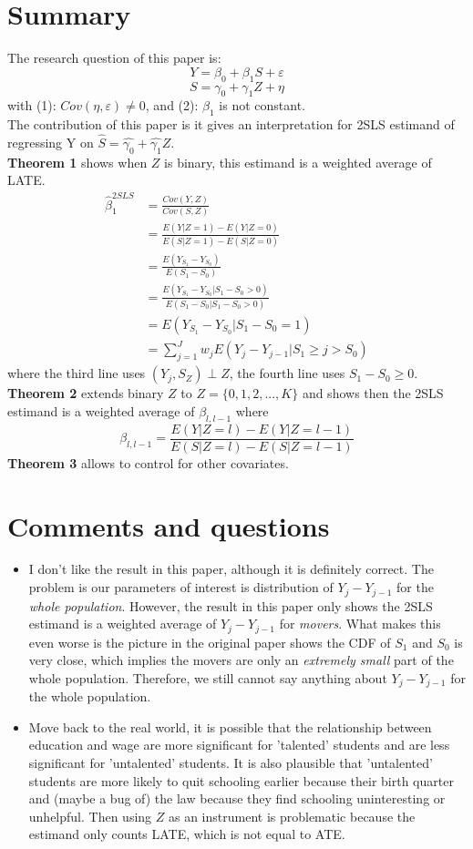 \documentclass[a4paper,11pt]{article}
\begin{document}
\section{Summary}
The research question of this paper is:
\[Y=\beta_0+\beta_1 S+\varepsilon\]
\[S=\gamma_0+\gamma_1 Z+\eta\]
with (1): $Cov(\eta,\varepsilon)\neq0$, and (2): $\beta_1$ is not constant. \\
The contribution of this paper is it gives an interpretation for 2SLS estimand of regressing Y on $\hat{S}=\hat{\gamma_0}+ \hat{\gamma_1} Z$. \\
\textbf{Theorem 1} shows when $Z$ is binary, this estimand is a weighted average of LATE.
\[\begin{aligned}
\hat{\beta}_1^{2SLS}&=\frac{Cov(Y,Z)}{Cov(S,Z)} \\
&=\frac{E(Y|Z=1)-E(Y|Z=0)}{E(S|Z=1)-E(S|Z=0)} \\
&=\frac{E(Y_{S_1}-Y_{S_0})}{E(S_1-S_0)} \\
&=\frac{E(Y_{S_1}-Y_{S_0}|S_1-S_0>0)}{E(S_1-S_0|S_1-S_0>0)} \\
&=E(Y_{S_1}-Y_{S_0}|S_1-S_0=1) \\
&=\sum_{j=1}^J w_j E(Y_j-Y_{j-1}|S_1 \geq j>S_0)
\end{aligned}\]
where the third line uses $(Y_j,S_Z) \perp Z$, the fourth line uses $S_1-S_0 \geq 0$. \\
\textbf{Theorem 2} extends binary $Z$ to $Z=\{0,1,2,...,K\}$ and shows then the 2SLS estimand is a weighted average of $\beta_{l,l-1}$ where
\[\beta_{l,l-1}=\frac{E(Y|Z=l)-E(Y|Z=l-1)}{E(S|Z=l)-E(S|Z=l-1)}\]
\textbf{Theorem 3} allows to control for other covariates.

\section{Comments and questions}
\begin{itemize}
\item
I don't like the result in this paper, although it is definitely correct. The problem is our parameters of interest is distribution of $Y_j-Y_{j-1}$ for the {\it whole population}. However, the result in this paper only shows the 2SLS estimand is a weighted average of $Y_j-Y_{j-1}$ for {\it movers}. What makes this even worse is the picture in the original paper shows the CDF of $S_1$ and $S_0$ is very close, which implies the movers are only an {\it extremely small} part of the whole population. Therefore, we still cannot say anything about $Y_j-Y_{j-1}$ for the whole population.
\item
Move back to the real world, it is possible that the relationship between education and wage are more significant for 'talented' students and are less significant for 'untalented' students. It is also plausible that 'untalented' students are more likely to quit schooling earlier because their birth quarter and (maybe a bug of) the law because they find schooling uninteresting or unhelpful. Then using $Z$ as an instrument is problematic because the estimand only counts LATE, which is not equal to ATE.
\end{itemize}
\end{document}
